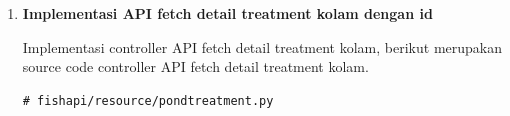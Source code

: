 \begin{enumerate}[1.]
Berikut merupakan hasil test request dari API delete treatment kolam.

cURL:

\begin{lstlisting}
curl --location --request DELETE 'http://jft.web.id/fishapi/api/pondtreatment/62e8b800ef4edacc5bb18b05'
\end{lstlisting}

response json:

\begin{lstlisting}
{
  "message": "success delete pond treatment"
}
\end{lstlisting}


\item \textbf{Implementasi API fetch detail treatment kolam dengan id}

Implementasi controller API fetch detail treatment kolam, berikut merupakan source code controller API fetch detail treatment kolam.

\begin{lstlisting}
# fishapi/resource/pondtreatment.py


\end{lstlisting}
\end{enumerate}

